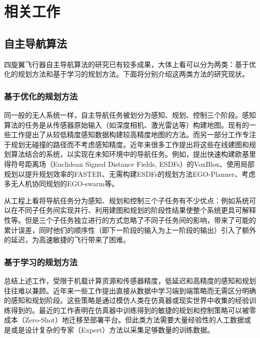 \section{相关工作}
\label{related_works}
\subsection{自主导航算法}
四旋翼飞行器自主导航算法的研究已有较多成果，大体上看可以分为两类：基于优化的规划方法和基于学习的规划方法。下面将分别介绍这两类方法的研究现状。
\subsubsection{基于优化的规划方法}
同一般的无人系统一样，自主导航任务被划分为感知、规划、控制三个阶段。感知算法的任务是从传感器原始输入（如深度相机、激光雷达等）构建地图。现有的一些工作提出了从较低精度感知数据构建较高精度地图的方法\cite{heng2014autonomous}\cite{saeedi20173d}\cite{faessler2016autonomous}。而另一部分工作专注于规划无碰撞的路径而不考虑感知精度\cite{allen2016real}\cite{liu2018search}。近年来很多工作提出将这些在线建图和规划算法结合的系统，以实现在未知环境中的导航任务。例如，提出快速构建欧基里得符号距离场（Euclidean Signed Distance Fields, ESDFs）的VoxBlox\cite{oleynikova2017voxblox}、使用局部规划以提升规划效率的FASTER\cite{tordesillas2019faster}、无需构建ESDFs的规划方法EGO-Planner\cite{zhou2020ego}、考虑多无人机协同规划的EGO-swarm\cite{zhou2021ego}等。

从工程上看将导航任务分为感知、规划和控制三个子任务有不少优点：例如系统可以在不同子任务间实现并行、利用建图和规划的阶段性结果使整个系统更具可解释性等。但是三个子任务独立进行的方式忽略了不同子任务间的影响，带来了可能的累计误差，同时他们的顺序性（即下一阶段的输入为上一阶段的输出）引入了额外的延迟，为高速敏捷的飞行带来了困难\cite{falanga2019fast}。

\subsubsection{基于学习的规划方法}
总结上述工作，受限于机载计算资源和传感器精度，低延迟和高精度的感知和规划往往难以兼顾\cite{falanga2019fast}。近年来一些工作提出直接从数据中学习端到端策略而无需区分明确的感知和规划阶段。这些策略是通过模仿人类在仿真器\cite{sadeghi2016cad2rl}\cite{loquercio2021learning}或现实世界\cite{gandhi2017learning}中收集的经验训练得到的。最近的工作表明在仿真器中训练得到的敏捷的规划和控制策略可以被零成本（Zero-Shot）地迁移至部署平台\cite{kaufmann2020deep}\cite{loquercio2021learning}。但此类方法需要大量经验性的人工数据或是\cite{sadeghi2016cad2rl}或是设计复杂的专家（Expert）方法以采集足够数量的训练数据\cite{loquercio2021learning}。

